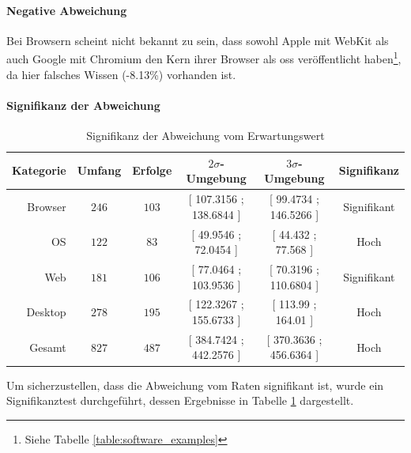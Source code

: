 \documentclass[a4paper]{article}
\begin{document}
                \paragraph{Negative Abweichung}
                    Bei Browsern scheint nicht bekannt zu sein, dass sowohl Apple mit WebKit als auch Google mit Chromium den Kern ihrer Browser als \gls{oss} veröffentlicht haben\footnote{Siehe Tabelle \ref{table:software_examples}}, da hier falsches Wissen ({\scriptsize -8.13\%}) vorhanden ist.                        %
                    
                \paragraph{Signifikanz der Abweichung}
                
                \begin{table}
                    \centering
                    \begin{tabular}{rccccc}
                        Kategorie & Umfang & Erfolge & $2\sigma$-Umgebung & $3\sigma$-Umgebung & Signifikanz \\\hline\hline
                        Browser & $246$ & $103$ & \tiny{[ 107.3156 ; 138.6844 ]} & \tiny{[ 99.4734 ; 146.5266 ]} & Signifikant\\
                        OS & $122$ & $83$ & \tiny{[ 49.9546 ; 72.0454 ]} &  \tiny{[ 44.432 ; 77.568 ]} & Hoch\\
                        Web & $181$ & $106$ & \tiny{[ 77.0464 ; 103.9536 ]} &  \tiny{[ 70.3196 ; 110.6804 ]} &  Signifikant\\
                        Desktop & $278$ & $195$ & \tiny{[ 122.3267 ; 155.6733 ]} & \tiny{[ 113.99 ; 164.01 ]} & Hoch\\\hline
                        Gesamt & $827$ & $487$ & \tiny{[ 384.7424 ; 442.2576 ]} & \tiny{[ 370.3636 ; 456.6364 ]} & Hoch
                    \end{tabular}
                    \caption{Signifikanz der Abweichung vom Erwartungswert}
                    \label{table:knowledge_by_category_sigma}
                \end{table}
                
                Um sicherzustellen, dass die Abweichung vom Raten signifikant ist, wurde ein Signifikanztest durchgeführt, dessen Ergebnisse in Tabelle \ref{table:knowledge_by_category_sigma} dargestellt. 
                
\end{document}
